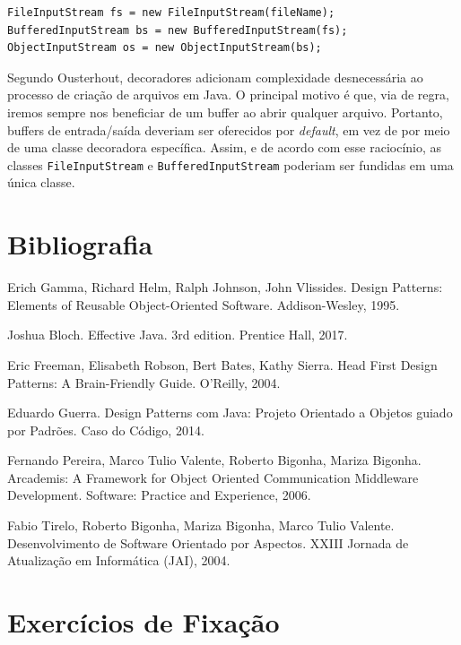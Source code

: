 \documentclass[
  11pt,
  twoside]{book}
\newcommand{\passthrough}[1]{#1}
\begin{document}
\begin{lstlisting}
FileInputStream fs = new FileInputStream(fileName);
BufferedInputStream bs = new BufferedInputStream(fs);
ObjectInputStream os = new ObjectInputStream(bs);
\end{lstlisting}

Segundo Ousterhout, decoradores adicionam complexidade desnecessária ao
processo de criação de arquivos em Java. O principal motivo é que, via
de regra, iremos sempre nos beneficiar de um buffer ao abrir qualquer
arquivo. Portanto, buffers de entrada/saída deveriam ser oferecidos por
\emph{default}, em vez de por meio de uma classe decoradora específica.
Assim, e de acordo com esse raciocínio, as classes
\passthrough{\lstinline!FileInputStream!} e
\passthrough{\lstinline!BufferedInputStream!} poderiam ser fundidas em
uma única classe.

\hypertarget{bibliografia-5}{%
\section*{Bibliografia}\label{bibliografia-5}}

Erich Gamma, Richard Helm, Ralph Johnson, John Vlissides. Design
Patterns: Elements of Reusable Object-Oriented Software. Addison-Wesley,
1995.

Joshua Bloch. Effective Java. 3rd edition. Prentice Hall, 2017.

Eric Freeman, Elisabeth Robson, Bert Bates, Kathy Sierra. Head First
Design Patterns: A Brain-Friendly Guide. O'Reilly, 2004.

Eduardo Guerra. Design Patterns com Java: Projeto Orientado a Objetos
guiado por Padrões. Caso do Código, 2014.

Fernando Pereira, Marco Tulio Valente, Roberto Bigonha, Mariza Bigonha.
Arcademis: A Framework for Object Oriented Communication Middleware
Development. Software: Practice and Experience, 2006.

Fabio Tirelo, Roberto Bigonha, Mariza Bigonha, Marco Tulio Valente.
Desenvolvimento de Software Orientado por Aspectos. XXIII Jornada de
Atualização em Informática (JAI), 2004.

\hypertarget{exercuxedcios-de-fixauxe7uxe3o-5}{%
\section*{Exercícios de
Fixação}\label{exercuxedcios-de-fixauxe7uxe3o-5}}
\end{document}
